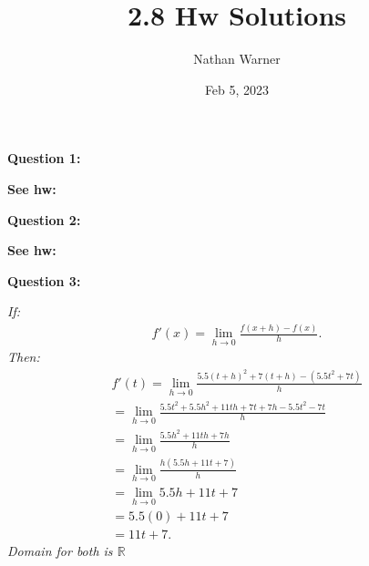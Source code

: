 \documentclass{report}
\title{\Huge{2.8 Hw Solutions}}
\author{\huge{Nathan Warner}}
\date{\huge{Feb 5, 2023}}
\begin{document}
    \maketitle
    \begin{Large}
        \noindent \textbf{Question 1:}
    \end{Large}
    \bigbreak \noindent 
    \bigbreak \noindent 
    \textbf{See hw:}

    \bigbreak \noindent \bigbreak \noindent \bigbreak \noindent 
    \begin{Large}
        \textbf{Question 2:}
    \end{Large}
    \bigbreak \noindent 
    \bigbreak \noindent 
    \textbf{See hw:}

    \bigbreak \noindent \bigbreak \noindent \bigbreak \noindent 
    \begin{Large}
        \textbf{Question 3:}
    \end{Large}
    \bigbreak \noindent 
    \bigbreak \noindent 
    \textit{If:}
    \begin{align*}
      f\prime(x)= \lim\limits_{h \to 0}{ \frac{f(x+h) - f(x)}{h}} 
    .\end{align*}
    \bigbreak \noindent 
    \textit{Then:}
    \begin{align*}
      f\prime(t) = \lim\limits_{h \to 0}{ \frac{5.5(t+h)^2+7(t+h) - (5.5t^2+7t)}{h}} \\
      = \lim\limits_{h \to 0}{ \frac{5.5t^2+5.5h^2+11th+7t+7h -5.5t^2-7t}{h}} \\
      = \lim\limits_{h \to 0}{ \frac{5.5h^2+11th+7h}{h}} \\
      = \lim\limits_{h \to 0}{ \frac{h(5.5h+11t+7)}{h}} \\ 
      = \lim\limits_{h \to 0}{5.5h+11t+7} \\ 
      = 5.5(0) + 11t + 7  \\
      = 11t+7
    .\end{align*}
    \bigbreak \noindent 
    \textit{Domain for both is $\mathbb{R}$}
\end{document}
